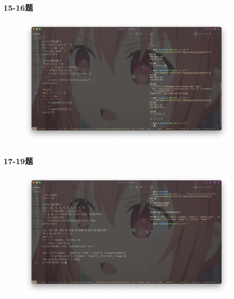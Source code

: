 \documentclass{beamer}
\begin{document}
  \begin{frame}[fragile]
    \frametitle{15-16题}
    \begin{figure}[!htb] %
      \includegraphics[width=1\textwidth,height=0.8\textheight]{./graph/python-trial-6.15-6.16.png} %
    \end{figure}
  \end{frame}
  \begin{frame}[fragile]
    \frametitle{17-19题}
    \begin{figure}[!htb] %
      \includegraphics[width=1\textwidth,height=0.8\textheight]{./graph/python-trial-6.17-6.19.png} %
    \end{figure}
  \end{frame}
\end{document}
